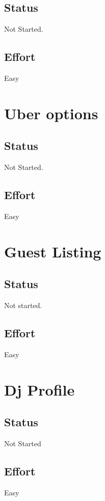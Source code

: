 \documentclass[10pt,a4paper]{article}
\begin{document}
\subsection{Status}
Not Started.

\subsection{Effort}
Easy

\section{Uber options}

\subsection{Status}
Not Started.

\subsection{Effort}
Easy

\section{Guest Listing}

\subsection{Status}
Not started.

\subsection{Effort}
Easy

\section{Dj Profile}

\subsection{Status}
Not Started

\subsection{Effort}
Easy
\end{document}
